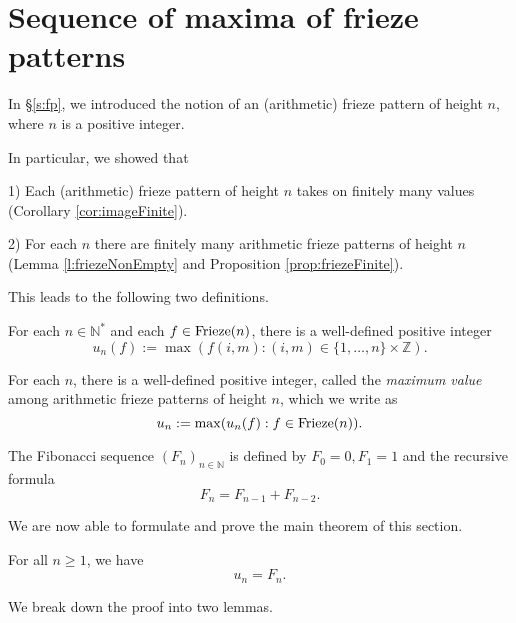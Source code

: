 \chapter{Sequence of maxima of frieze patterns}
In \S \ref{s:fp}, we introduced the notion of an (arithmetic) frieze pattern of height $n$, where $n$ is a positive integer.

In particular, we showed that 

1) Each (arithmetic) frieze pattern of height $n$ takes on finitely many values (Corollary \ref{cor:imageFinite}). 

2) For each $n$ there are finitely many arithmetic frieze patterns of height $n$ (Lemma \ref{l:friezeNonEmpty} and 
Proposition \ref{prop:friezeFinite}).

This leads to the following two definitions.
\begin{definition}
    \label{def:unf}
For each $n \in \mathbb{N}^*$ and each $f \in {\rm Frieze}(n)$, there is a well-defined positive integer
\[
    u_n(f) := \max ( f (i,m) : (i,m)  \in \{1,\ldots,n \}\times \mathbb{Z}).
\]
\end{definition}

\begin{definition}
    \label{def:un}
    For each $n$, there is a well-defined
    positive integer, called the {\it maximum value} among arithmetic frieze patterns of height $n$, which we write as
    \[
        u_n := \max (u_n(f) : f \in  {\rm Frieze}(n)).
    \]
\end{definition}

\begin{definition}
    \label{def:fib}
    The Fibonacci sequence $(F_n)_{n \in \mathbb{N}}$ is defined by $F_0 = 0, F_1 = 1$ and the recursive formula
    \[
        F_n = F_{n-1} + F_{n-2}.
    \]
\end{definition}


We are now able to formulate and prove the main theorem of this section.
\begin{theorem}
    \label{mainTheorem}
    For all $n \geq 1$, we have 
    \[
        u_n = F_{n}.
    \]    
\end{theorem}
We break down the proof into two lemmas. 

